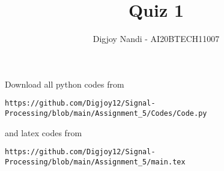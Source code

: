 \documentclass[journal,12pt,twocolumn]{IEEEtran}
\DeclareMathOperator*{\Res}{Res}
\begin{document}
\newcommand{\BEQA}{\begin{eqnarray}}
\newcommand{\EEQA}{\end{eqnarray}}
\newcommand{\define}{\stackrel{\triangle}{=}}

\raggedbottom
\setlength{\parindent}{0pt}
\providecommand{\mbf}{\mathbf}
\providecommand{\pr}[1]{\ensuremath{\Pr\left(#1\right)}}
\providecommand{\qfunc}[1]{\ensuremath{Q\left(#1\right)}}
\providecommand{\sbrak}[1]{\ensuremath{{}\left[#1\right]}}
\providecommand{\lsbrak}[1]{\ensuremath{{}\left[#1\right.}}
\providecommand{\rsbrak}[1]{\ensuremath{{}\left.#1\right]}}
\providecommand{\brak}[1]{\ensuremath{\left(#1\right)}}
\providecommand{\lbrak}[1]{\ensuremath{\left(#1\right.}}
\providecommand{\rbrak}[1]{\ensuremath{\left.#1\right)}}
\providecommand{\cbrak}[1]{\ensuremath{\left\{#1\right\}}}
\providecommand{\lcbrak}[1]{\ensuremath{\left\{#1\right.}}
\providecommand{\rcbrak}[1]{\ensuremath{\left.#1\right\}}}
\theoremstyle{remark}
\newtheorem{rem}{Remark}
\newcommand{\sgn}{\mathop{\mathrm{sgn}}}
\providecommand{\abs}[1]{\vert#1\vert}
\providecommand{\res}[1]{\Res\displaylimits_{#1}} 
\providecommand{\norm}[1]{\lVert#1\rVert}
\providecommand{\mtx}[1]{\mathbf{#1}}
\providecommand{\mean}[1]{E[ #1 ]}
\providecommand{\fourier}{\overset{\mathcal{F}}{ \rightleftharpoons}}
\providecommand{\system}{\overset{\mathcal{H}}{ \longleftrightarrow}}
\newcommand{\solution}{\noindent \textbf{Solution: }}
\newcommand{\cosec}{\,\text{cosec}\,}
\providecommand{\dec}[2]{\ensuremath{\overset{#1}{\underset{#2}{\gtrless}}}}
\newcommand{\myvec}[1]{\ensuremath{\begin{pmatrix}#1\end{pmatrix}}}
\newcommand{\mydet}[1]{\ensuremath{\begin{vmatrix}#1\end{vmatrix}}}
\makeatletter
{}
\makeatother
\let\StandardTheFigure\thefigure
\let\vec\mathbf
\renewcommand{\thefigure}{\theproblem}
\def\putbox#1#2#3{\makebox[0in][l]{\makebox[#1][l]{}\raisebox{\baselineskip}[0in][0in]{\raisebox{#2}[0in][0in]{#3}}}}
     \def\rightbox#1{\makebox[0in][r]{#1}}
     \def\centbox#1{\makebox[0in]{#1}}
     \def\topbox#1{\raisebox{-\baselineskip}[0in][0in]{#1}}
     \def\midbox#1{\raisebox{-0.5\baselineskip}[0in][0in]{#1}}
\vspace{3cm}
\title{Quiz 1}
\author{Digjoy Nandi - AI20BTECH11007}
\maketitle
\newpage
\bigskip
\renewcommand{\thefigure}{\theenumi}
\renewcommand{\thetable}{\theenumi}
Download all python codes from 
\begin{lstlisting}
https://github.com/Digjoy12/Signal-Processing/blob/main/Assignment_5/Codes/Code.py
\end{lstlisting}
%
and latex codes from 
%
\begin{lstlisting}
https://github.com/Digjoy12/Signal-Processing/blob/main/Assignment_5/main.tex
\end{lstlisting}
\end{document}
